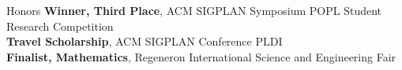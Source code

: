 
\begin{rSection}{Honors}
	\textbf{Winner, Third Place}, ACM SIGPLAN Symposium POPL Student Research Competition \hfill \color{darkgray}{2023} 
	\color{black}
	\\
	\textbf{Travel Scholarship}, ACM SIGPLAN Conference PLDI \hfill \color{darkgray}{2022}
	\color{black}
	\\
	\textbf{Finalist, Mathematics}, Regeneron International Science and Engineering Fair \hfill \color{darkgray}{2020 \& 2021}
	\color{black} 

\end{rSection} 